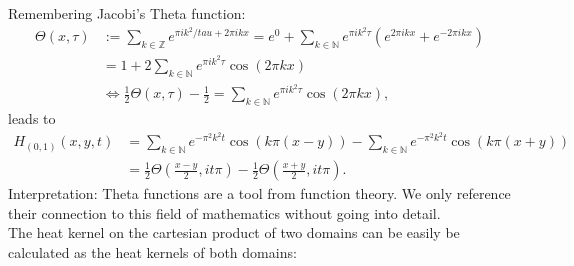 \documentclass[A4,12pt,twoside]{book}
\begin{document}
Remembering Jacobi's Theta function: 
\begin{align*}
    \Theta (x,\tau ) &:= \sum_{k \in \mathbb{Z}} e^{\pi i k^2 /tau + 2 \pi i k x} = e^0 + \sum_{k \in \mathbb{N}} e^{\pi i k^2 \tau } \left( e^{ 2 \pi i k x} + e^{ -2 \pi i k x} \right) \\
    &= 1+ 2 \sum_{k \in \mathbb{N}} e^{\pi i k^2 \tau} \cos (2 \pi k x) \\
    &\iff \frac{1}{2} \Theta (x,\tau) - \frac{1}{2} = \sum_{k \in \mathbb{N}} e^{\pi i k^2 \tau} \cos (2 \pi k x),
\end{align*}
leads to 
\begin{align*}
    H_{(0,1)} (x,y,t) &= \sum_{k \in \mathbb{N}} e^{- \pi^2 k^2 t} \cos (k \pi (x-y)) - \sum_{k \in \mathbb{N}} e^{- \pi^2 k^2 t} \cos (k \pi (x+y)) \\
    &= \frac{1}{2} \Theta (\frac{x-y}{2}, i t \pi) - \frac{1}{2} \Theta (\frac{x+y}{2}, i t \pi ).
\end{align*}
Interpretation: Theta functions are a tool from function theory. We only reference their connection to this field of mathematics without going into detail.\\
The heat kernel on the cartesian product of two domains can be easily be calculated as the heat kernels of both domains:
\end{document}
